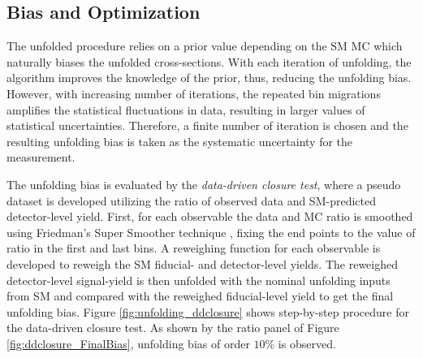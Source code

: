 \subsection{Bias and Optimization}
\label{subsec:Bias}

The unfolded procedure relies on a prior value depending on the SM MC which naturally biases the unfolded cross-sections. With each iteration of unfolding, the algorithm improves the knowledge of the prior, thus, reducing the unfolding bias. However, with increasing number of iterations, the repeated bin migrations amplifies the statistical fluctuations in data, resulting in larger values of statistical uncertainties. Therefore, a finite number of iteration is chosen and the resulting unfolding bias is taken as the systematic uncertainty for the measurement. 

The unfolding bias is evaluated by the \textit{data-driven closure test}, where a pseudo dataset is developed utilizing the ratio of observed data and SM-predicted detector-level yield. First, for each observable the data and MC ratio is smoothed using Friedman's Super Smoother technique \cite{FriedmanSmoother}, fixing the end points to the value of ratio in the first and last bins. A reweighing function for each observable is developed to reweigh the SM fiducial- and detector-level yields. The reweighed detector-level signal-yield is then unfolded with the nominal unfolding inputs from SM and compared with the reweighed fiducial-level yield to get the final unfolding bias. Figure \ref{fig:unfolding_ddclosure} shows step-by-step procedure for the data-driven closure test. As shown by the ratio panel of Figure \ref{fig:ddclosure_FinalBias}, unfolding bias of order $10\%$ is observed. 

